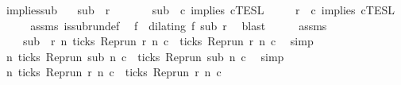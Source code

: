 \begin{isabellebody}
\isamarkupfalse%
\ implies{\isacharunderscore}sub{\isacharcolon}\isanewline
\ \ \ {\isacartoucheopen}sub\ {\isasymlless}\ r{\isacartoucheclose}\isanewline
\ \ \ \ \ \ \ {\isacartoucheopen}sub\ {\isasymin}\ {\isasymlbrakk}c\ implies\ c\isactrlsub T\isactrlsub E\isactrlsub S\isactrlsub L{\isacartoucheclose}\isanewline
\ \ \ \ \ {\isacartoucheopen}r\ {\isasymin}\ {\isasymlbrakk}c\ implies\ c\isactrlsub T\isactrlsub E\isactrlsub S\isactrlsub L{\isacartoucheclose}\isanewline
%
\isadelimproof
%
\endisadelimproof
%
\isatagproof
{}\isamarkupfalse%
\ {\isacharminus}\isanewline
\ \ \isamarkupfalse%
\ assms{\isacharparenleft}{}{\isacharparenright}\ is{\isacharunderscore}subrun{\isacharunderscore}def\ \isamarkupfalse%
\ f\ \ {\isacartoucheopen}dilating\ f\ sub\ r{\isacartoucheclose}\ \isamarkupfalse%
\ blast\isanewline
\ \ \isamarkupfalse%
\ \isamarkupfalse%
\ assms{\isacharparenleft}{}{\isacharparenright}\ \isamarkupfalse%
\isanewline
\ \ \ \ {\isacartoucheopen}sub\ {\isasymin}\ {\isacharbraceleft}r{\isachardot}\ {\isasymforall}n{\isachardot}\ ticks\ {\isacharparenleft}{\isacharparenleft}Rep{\isacharunderscore}run\ r{\isacharparenright}\ n\ c\ {\isasymlongrightarrow}\ ticks\ {\isacharparenleft}{\isacharparenleft}Rep{\isacharunderscore}run\ r{\isacharparenright}\ n\ c\ \isamarkupfalse%
\ simp\isanewline
\ \ \isamarkupfalse%
\ {\isacartoucheopen}{\isasymforall}n{\isachardot}\ ticks\ {\isacharparenleft}{\isacharparenleft}Rep{\isacharunderscore}run\ sub{\isacharparenright}\ n\ c\ {\isasymlongrightarrow}\ ticks\ {\isacharparenleft}{\isacharparenleft}Rep{\isacharunderscore}run\ sub{\isacharparenright}\ n\ c\ \isamarkupfalse%
\ simp\isanewline
\ \ \isamarkupfalse%
\ \isamarkupfalse%
\ {\isacartoucheopen}{\isasymforall}n{\isachardot}\ ticks\ {\isacharparenleft}{\isacharparenleft}Rep{\isacharunderscore}run\ r{\isacharparenright}\ n\ c\ {\isasymlongrightarrow}\ ticks\ {\isacharparenleft}{\isacharparenleft}Rep{\isacharunderscore}run\ r{\isacharparenright}\ n\ c\isanewline

\end{isabellebody}
